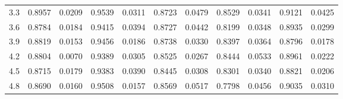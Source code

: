 \begin{tabular}{rrrrrrrrrrr}
       3.3 &   0.8957 & 0.0209 &               0.9539 & 0.0311 &                   0.8723 & 0.0479 &               0.8529 & 0.0341 &                       0.9121 & 0.0425 \\
       3.6 &   0.8784 & 0.0184 &               0.9415 & 0.0394 &                   0.8727 & 0.0442 &               0.8199 & 0.0348 &                       0.8935 & 0.0299 \\
       3.9 &   0.8819 & 0.0153 &               0.9456 & 0.0186 &                   0.8738 & 0.0330 &               0.8397 & 0.0364 &                       0.8796 & 0.0178 \\
       4.2 &   0.8804 & 0.0070 &               0.9389 & 0.0305 &                   0.8525 & 0.0267 &               0.8444 & 0.0533 &                       0.8961 & 0.0222 \\
       4.5 &   0.8715 & 0.0179 &               0.9383 & 0.0390 &                   0.8445 & 0.0308 &               0.8301 & 0.0340 &                       0.8821 & 0.0206 \\
       4.8 &   0.8690 & 0.0160 &               0.9508 & 0.0157 &                   0.8569 & 0.0517 &               0.7798 & 0.0456 &                       0.9035 & 0.0310 \\
\bottomrule
\end{tabular}
